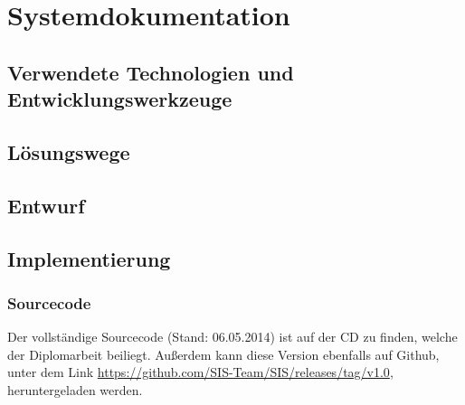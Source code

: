 \chapter{Systemdokumentation}

\section[Technologien]{Verwendete Technologien und Entwicklungswerkzeuge}






\newpage
\section{Lösungswege}












\newpage
\section{Entwurf} %













\newpage
\section{Implementierung}












%

\subsection{Sourcecode}
\label{sec:content_imle_source}

Der vollständige Sourcecode (Stand: 06.05.2014) ist auf der CD zu finden, welche der Diplomarbeit beiliegt. Außerdem kann diese Version ebenfalls auf Github, unter dem Link \url{https://github.com/SIS-Team/SIS/releases/tag/v1.0}, heruntergeladen werden.